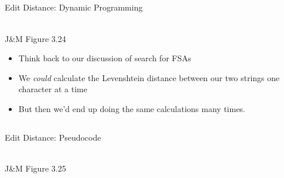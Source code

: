 \documentclass[9pt,xcolor=pdftex,dvipsnames,table]{beamer}
\begin{document}
\subsection{}
\begin{frame}{Edit Distance: Dynamic Programming}

\begin{center}
	\\
	{\large J\&M Figure 3.24}\\
\end{center}

\begin{itemize}
     \item Think back to our discussion of search for FSAs
     \item We \emph{could} calculate the Levenshtein distance between our two strings one character at a time
     \item But then we'd end up doing the same calculations many times.
\end{itemize}

\end{frame}

\subsection{}
\begin{frame}{Edit Distance: Pseudocode}
\begin{center}
	\\
	{\large J\&M Figure 3.25}\\
\end{center}
\end{frame}
\end{document}
